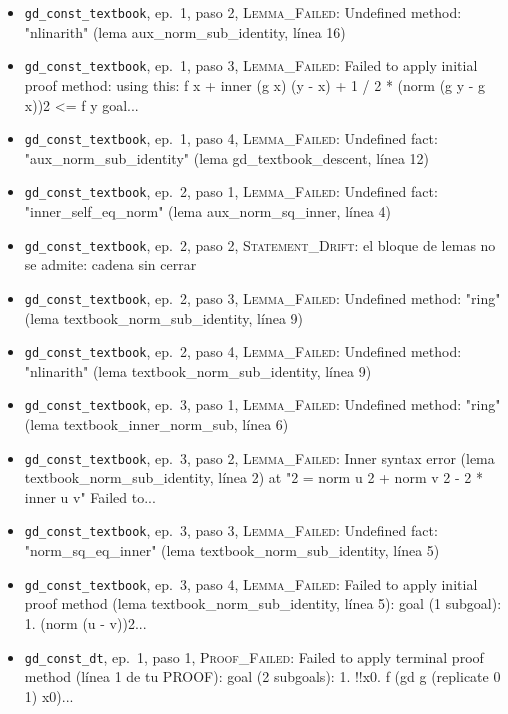 \documentclass[11pt,a4paper]{article}
\begin{document}
{\begin{itemize}
  \item \texttt{gd\_\allowbreak{}const\_\allowbreak{}textbook}, ep.~1, paso 2, \textsc{Lemma\_Failed}: Undefined method: "nlinarith" (lema aux\_norm\_sub\_identity, línea 16)
  \item \texttt{gd\_\allowbreak{}const\_\allowbreak{}textbook}, ep.~1, paso 3, \textsc{Lemma\_Failed}: Failed to apply initial proof method: using this: f x + inner (g x) (y - x) + 1 / 2 * (norm (g y - g x))2 <= f y goal...
  \item \texttt{gd\_\allowbreak{}const\_\allowbreak{}textbook}, ep.~1, paso 4, \textsc{Lemma\_Failed}: Undefined fact: "aux\_norm\_sub\_identity" (lema gd\_textbook\_descent, línea 12)
  \item \texttt{gd\_\allowbreak{}const\_\allowbreak{}textbook}, ep.~2, paso 1, \textsc{Lemma\_Failed}: Undefined fact: "inner\_self\_eq\_norm" (lema aux\_norm\_sq\_inner, línea 4)
  \item \texttt{gd\_\allowbreak{}const\_\allowbreak{}textbook}, ep.~2, paso 2, \textsc{Statement\_Drift}: el bloque de lemas no se admite: cadena sin cerrar
  \item \texttt{gd\_\allowbreak{}const\_\allowbreak{}textbook}, ep.~2, paso 3, \textsc{Lemma\_Failed}: Undefined method: "ring" (lema textbook\_norm\_sub\_identity, línea 9)
  \item \texttt{gd\_\allowbreak{}const\_\allowbreak{}textbook}, ep.~2, paso 4, \textsc{Lemma\_Failed}: Undefined method: "nlinarith" (lema textbook\_norm\_sub\_identity, línea 9)
  \item \texttt{gd\_\allowbreak{}const\_\allowbreak{}textbook}, ep.~3, paso 1, \textsc{Lemma\_Failed}: Undefined method: "ring" (lema textbook\_inner\_norm\_sub, línea 6)
  \item \texttt{gd\_\allowbreak{}const\_\allowbreak{}textbook}, ep.~3, paso 2, \textsc{Lemma\_Failed}: Inner syntax error (lema textbook\_norm\_sub\_identity, línea 2) at "2 = norm u 2 + norm v 2 - 2 * inner u v" Failed to...
  \item \texttt{gd\_\allowbreak{}const\_\allowbreak{}textbook}, ep.~3, paso 3, \textsc{Lemma\_Failed}: Undefined fact: "norm\_sq\_eq\_inner" (lema textbook\_norm\_sub\_identity, línea 5)
  \item \texttt{gd\_\allowbreak{}const\_\allowbreak{}textbook}, ep.~3, paso 4, \textsc{Lemma\_Failed}: Failed to apply initial proof method (lema textbook\_norm\_sub\_identity, línea 5): goal (1 subgoal): 1. (norm (u - v))2...
  \item \texttt{gd\_\allowbreak{}const\_\allowbreak{}dt}, ep.~1, paso 1, \textsc{Proof\_Failed}: Failed to apply terminal proof method (línea 1 de tu PROOF): goal (2 subgoals): 1. !{}!x0. f (gd g (replicate 0 1) x0)...

\end{itemize}}
\end{document}
